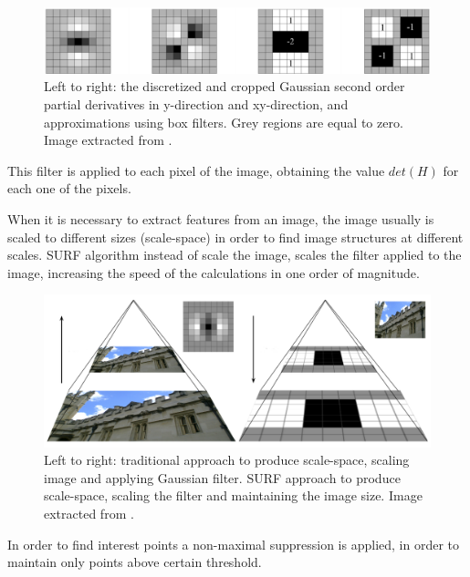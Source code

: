\begin{figure}[!h]
\begin{center}
\includegraphics[scale=0.35]{images/surf_mask}
\caption{Left to right: the discretized and cropped Gaussian second order partial derivatives 
in y-direction and xy-direction, and approximations using box filters. 
Grey regions are equal to zero. Image extracted from \cite{Bay06surf}.}
\end{center}
\end{figure}

This filter is applied to each pixel of the image, obtaining the value $det(H)$ for each one of the pixels. 

When it is necessary to extract features from an image, the image  usually is scaled to different sizes (scale-space) in order 
to find image structures 
at different scales. SURF algorithm instead of scale the image, scales the filter applied to the 
image, increasing the speed of the calculations in one order of magnitude.

\begin{figure}[!h]
\begin{center}
\includegraphics[scale=0.35]{images/surf_scale}
\caption{Left to right: traditional approach to produce scale-space, scaling image and applying Gaussian filter. SURF approach to produce scale-space, scaling the filter and maintaining the image size. Image extracted from \cite{miguel}.}
\end{center}
\end{figure}


In order to find interest points a non-maximal suppression is applied, in order to maintain only points above certain threshold. 

